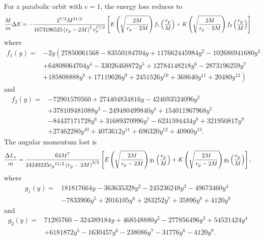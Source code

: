 For a parabolic orbit with $e = 1$, the energy loss reduces to
\begin{equation}
\frac{M}{m} \Delta E = -\frac{2^{7/2}M^{{21}/{2}}}{{1673196525 \left(r_\mathrm{p} - 2 M\right)^2 r_\mathrm{p}^{{17}/{2}}}} \left[E\left(\sqrt{\frac{2 M}{r_\mathrm{p} - 2 M}}\right) f_1\left(\frac{r_\mathrm{p}}{M}\right) + K\left(\sqrt{\frac{2 M}{r_\mathrm{p} - 2 M}}\right) f_2\left(\frac{r_\mathrm{p}}{M}\right)\right]
\end{equation}
where
\begin{align}
f_1(y) = {} & - 2 y \left(27850061568 - 83550184704 y + 117662445984 y^2 - 102686941680 y^3  \right. \nonumber \\ 
 {} & + \left. 64808064704 y^4 - 33026468872 y^5 + 12784148218 y^6 - 2873196259 y^7 \right. \nonumber \\ 
 {} & + \left. 185808888 y^8 + 17119626 y^9 + 2451526 y^{10} + 368640 y^{11} + 20480 y^{12} \right)
\end{align}
and
\begin{align}
f_2(y) = {} & -72901570560 + 274404834816 y - 424693524096 y^2 \nonumber \\ 
 {} & + \left. 378109481088 y^3 - 249480499840 y^4 + 154011967968 y^5 \right. \nonumber \\ 
 {} & - \left. 84437171728 y^6 + 31689370996 y^7 - 6231594434 y^8 + 321950817 y^9 \right. \nonumber \\ 
 {} & + \left. 27462280 y^{10} + 4073612 y^{11} + 696320 y^{12} + 40960 y^{13}. \right.
\end{align}
The angular momentum lost is
\begin{equation}
\frac{\Delta L_{z}}{m} = \frac{64 M^7}{24249225 {r_\mathrm{p}}^{{11}/{2}}\left(r_\mathrm{p} - 2 M \right)^{{3}/{2}}} \left[E\left(\sqrt{\frac{2 M}{r_\mathrm{p} - 2 M}}\right) g_1\left(\frac{r_\mathrm{p}}{M}\right) + K\left(\sqrt{\frac{2 M}{r_\mathrm{p} - 2 M}}\right) g_2\left(\frac{r_\mathrm{p}}{M}\right)\right],
\end{equation}
where
\begin{align}
g_1(y) = {} & 181817664 y - 363635328 y^2 - 245236248 y^3 - 49673460 y^4  \nonumber \\
 {} & - \left. 7833906 y^5 + 2016105 y^6 + 283252 y^7 + 35896 y^8 + 4120 y^9 \right.
\end{align}
and
\begin{align}
g_2(y) = {} & 71285760 - 324389184 y + 468548880 y^2 - 277856496 y^3 + 54521424 y^4 \nonumber \\
 {} & + \left. 6181872 y^5 - 1630457 y^6 - 238086 y^7 - 31776 y^8 - 4120 y^9. \right.
\end{align}
